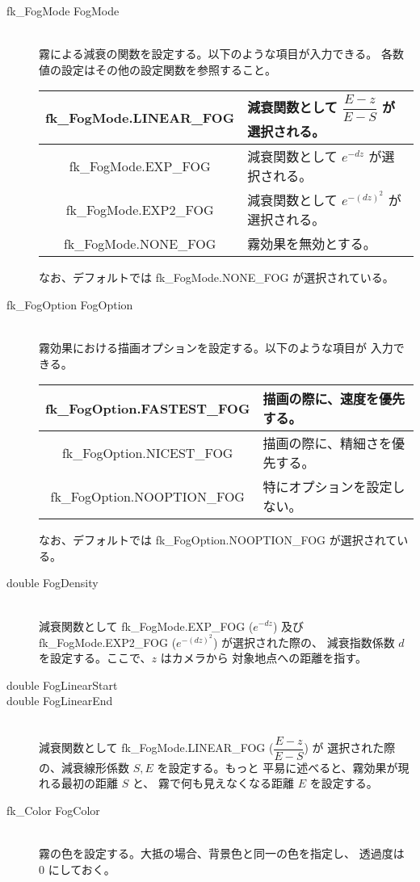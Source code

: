 \begin{description}
 \item[\hspace*{0.6cm}fk\_FogMode FogMode] ~ \\
	霧による減衰の関数を設定する。以下のような項目が入力できる。
	各数値の設定はその他の設定関数を参照すること。
	\begin{center}
	\begin{tabular}{|c|p{7cm}|}
	\hline
	fk\_FogMode.LINEAR\_FOG & 減衰関数として \(\dfrac{E - z}{E - S}\) が
		選択される。\\ \hline
	fk\_FogMode.EXP\_FOG & 減衰関数として \(e^{-dz}\) が選択される。\\ \hline
	fk\_FogMode.EXP2\_FOG & 減衰関数として \(e^{-(dz)^2}\) が選択される。\\ \hline
	fk\_FogMode.NONE\_FOG & 霧効果を無効とする。\\ \hline
	\end{tabular}
	\end{center}
	なお、デフォルトでは fk\_FogMode.NONE\_FOG が選択されている。

 \item[\hspace*{0.6cm}fk\_FogOption FogOption] ~ \\
	霧効果における描画オプションを設定する。以下のような項目が
	入力できる。
	\begin{center}
	\begin{tabular}{|c|p{7cm}|}
	\hline
	fk\_FogOption.FASTEST\_FOG & 描画の際に、速度を優先する。\\ \hline
	fk\_FogOption.NICEST\_FOG & 描画の際に、精細さを優先する。\\ \hline
	fk\_FogOption.NOOPTION\_FOG & 特にオプションを設定しない。\\ \hline
	\end{tabular}
	\end{center}
	なお、デフォルトでは fk\_FogOption.NOOPTION\_FOG が選択されている。

 \item[\hspace*{0.6cm}double FogDensity] ~ \\
	減衰関数として fk\_FogMode.EXP\_FOG (\(e^{-dz}\)) 
	及び fk\_FogMode.EXP2\_FOG (\(e^{-(dz)^2}\)) が選択された際の、	
	減衰指数係数 \(d\) を設定する。ここで、\(z\) はカメラから
	対象地点への距離を指す。

 \item[\hspace*{0.6cm}double FogLinearStart]
 \item[\hspace*{0.6cm}double FogLinearEnd] ~ \\
	減衰関数として fk\_FogMode.LINEAR\_FOG (\(\dfrac{E - z}{E - S}\)) が
	選択された際の、減衰線形係数 \(S, E\) を設定する。もっと
	平易に述べると、霧効果が現れる最初の距離 \(S\) と、
	霧で何も見えなくなる距離 \(E\) を設定する。

 \item[\hspace*{0.6cm}fk\_Color FogColor] ~ \\
	霧の色を設定する。大抵の場合、背景色と同一の色を指定し、
	透過度は 0 にしておく。
\end{description}


